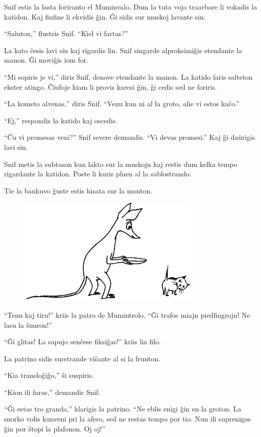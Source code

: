 Snif estis la lasta foriranto el Muminvalo. Dum la tuta vojo traarbare li vokadis la katidon. Kaj finfine li ekvidis ĝin. Ĝi sidis sur muskoj lavante sin.

``Saluton,'' flustris Snif. ``Kiel vi fartas?''

La kato ĉesis lavi sin kaj rigardis lin. Snif singarde alproksimiĝis etendante la manon. Ĝi moviĝis iom for.

``Mi sopiris je vi,'' diris Snif, denove etendante la manon. La katido faris salteton ekster atingo. Ĉiufoje kiam li provis karesi ĝin, ĝi cedis sed ne foriris.

``La kometo alvenas,'' diris Snif. ``Venu kun ni al la groto, alie vi estos kaĉo.''

``Ej,'' respondis la katido kaj oscedis.

``Ĉu vi promesas veni?'' Snif severe demandis. ``Vi devas promesi.'' Kaj ĝi daŭrigis lavi sin.

Snif metis la subtason kun lakto sur la muskojn kaj restis dum kelka tempo rigardante la katidon. Poste li kuris pluen al la sablostrando.

Tie la bankuvo ĝuste estis hisata sur la monton.

\begin{figure}[htbp]
\centering
\includegraphics[width=250pt,height=147pt]{9-5.png}
\caption{}
\label{9-5}
\end{figure}

``Tenu kaj tiru!'' kriis la patro de Mumintrolo. ``Ĝi trafos miajn piedfingrojn! Ne lasu la ŝnuron!''

``Ĝi glitas! La sapujo senĉese fiksiĝas!'' kriis lia filo.

La patrino sidis surstrande viŝante al si la frunton.

``Kia transloĝiĝo,'' ŝi suspiris.

``Kion ili faras,'' demandis Snif.

``Ĝi estas tro granda,'' klarigis la patrino. ``Ne eblis enigi ĝin en la groton. La snorko volis kunveni pri la afero, sed ne restas tempo por tio. Nun ili suprenigos ĝin por ŝtopi la plafonon. Oj oj!''

